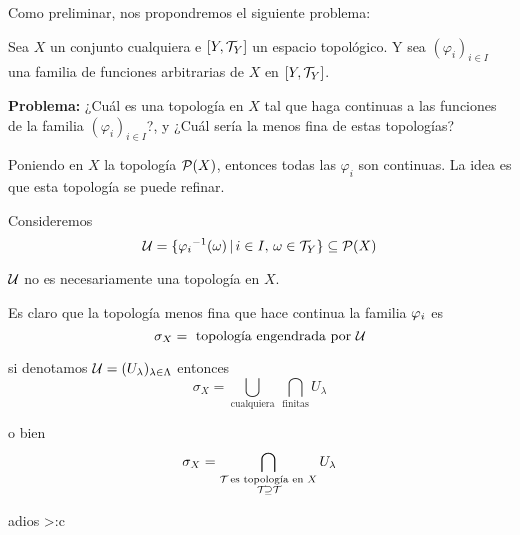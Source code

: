 Como preliminar, nos propondremos el siguiente problema:

Sea $X$ un conjunto cualquiera e $[Y, \TAU[Y] ]$ un espacio topológico. Y sea $(\varphi_{i})_{i \in I}$ una familia de funciones arbitrarias de $X$ en $[Y, \TAU[Y] ]$.

\textbf{Problema:} ¿Cuál es una topología en $X$ tal que haga continuas a las funciones de la familia $(\varphi_{i})_{i \in I}$?, y ¿Cuál sería la menos fina de estas topologías?

Poniendo en $X$ la topología $\cp(X)$, entonces todas las $\varphi_{i}$ son continuas. La idea es que esta topología se puede refinar.

Consideremos $$
\cu = \{ 
{\PHI[i]}^{-1} (\omega) \,|\, i \in I,\, \omega \in \TAU[Y]
\} \subseteq \cp (X)
$$

$\cu$ no es necesariamente una topología en $X$.

Es claro que la topología menos fina que hace continua la familia $\PHI[i]$ es $$
\sigma_X = \text{ topología engendrada por $\cu$}
$$

si denotamos $\cu = (U_{\lambda})_{\lambda \in \Lambda}$ entonces $$
\sigma_{X} 
= \bigcup_{\text{cualquiera}} \ \bigcap_{\text{finitas}} U_{\lambda}
$$

o bien $$
\sigma_{X} 
= \bigcap_{
\begin{subarray}{c}
\TAU \text{ es topología en } X \\ \TAU \supseteq \TAU
\end{subarray}
} U_{\lambda}
$$

adios >:c